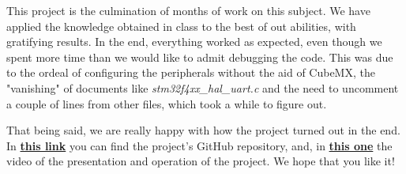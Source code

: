 This project is the culmination of months of work on this subject. We have applied the knowledge obtained in class to the best of out abilities, with gratifying results. In the end, everything worked as expected, even though we spent more time than we would like to admit debugging the code. This was due to the ordeal of configuring the peripherals without the aid of CubeMX, the "vanishing" of documents like \textit{stm32f4xx\_hal\_uart.c} and the need to uncomment a couple of lines from other files, which took a while to figure out. \medskip

That being said, we are really happy with how the project turned out in the end. In \href{https://github.com/anacalo24/MicroProject}{\textbf{this link}} you can find the project's GitHub repository, and, in \href{https://www.youtube.com/watch?v=KtsXlKJ0ibM}{\textbf{this one}} the video of the presentation and operation of the project. We hope that you like it!
